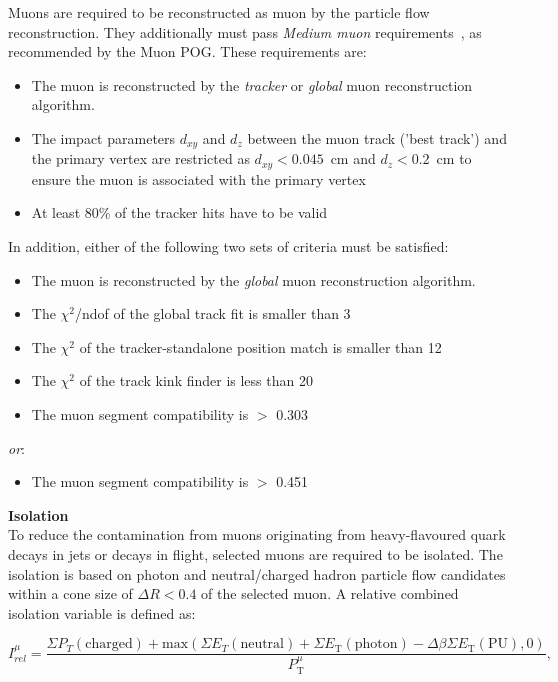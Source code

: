 Muons are required to be reconstructed as muon by the particle flow reconstruction. They additionally must pass \textit{Medium muon} requirements~\cite{cmsMediumMuon}, 
as recommended by the Muon POG. These requirements are:
\begin{itemize}
\item The muon is reconstructed by the \textit{tracker} or \textit{global} muon reconstruction algorithm.
\item The impact parameters $d_{xy}$ and $d_{z}$ between the muon track ('best track') 
and the primary vertex are restricted as $d_{xy}<0.045$~cm and $d_{z}<0.2$~cm to ensure the muon is associated with the primary vertex
\item At least 80\% of the tracker hits have to be valid
\end{itemize}
In addition, either of the following two sets of criteria must be satisfied:
\begin{itemize}
\item The muon is reconstructed by the \textit{global} muon reconstruction algorithm.
\item The $\chi^2$/ndof of the global track fit is smaller than 3
\item The $\chi^2$ of the tracker-standalone position match is smaller than 12
\item The $\chi^2$ of the track kink finder is less than 20
\item The muon segment compatibility is $>$ 0.303
\end{itemize}
\textit{or}:
\begin{itemize}
\item The muon segment compatibility is $>$ 0.451 
\end{itemize}

\textbf{Isolation}~\\
To reduce the contamination from muons originating from heavy-flavoured quark decays in jets or decays in flight, selected muons are required to be isolated. The isolation is based on photon and neutral/charged hadron particle flow candidates within a cone size of $\Delta R<0.4$ of the selected muon. A relative combined isolation variable is defined as:

\begin{equation}
\label{eqn:reliso}
I_{rel}^{\mu} = \frac{\Sigma P_{T}(\text{charged}) + \mathrm{max}(\Sigma E_{T}(\text{neutral}) + \Sigma E_{\text{T}}(\text{photon}) - \Delta\beta \Sigma E_{\text{T}}(\text{PU}),0)}{P_{\text{T}}^{\mu}},
\end{equation}

